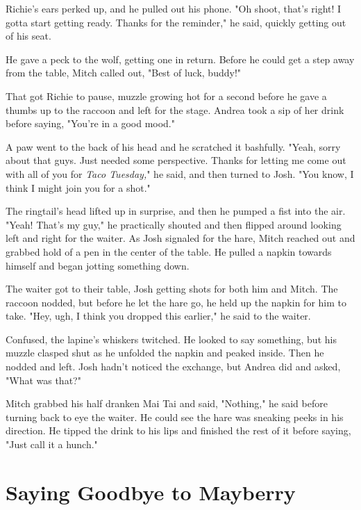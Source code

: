 Richie's ears perked up, and he pulled out his phone. "Oh shoot, that's right! I gotta start getting ready. Thanks for the reminder," he said, quickly getting out of his seat.

He gave a peck to the wolf, getting one in return. Before he could get a step away from the table, Mitch called out, "Best of luck, buddy!"

That got Richie to pause, muzzle growing hot for a second before he gave a thumbs up to the raccoon and left for the stage. Andrea took a sip of her drink before saying, "You're in a good mood."

A paw went to the back of his head and he scratched it bashfully. "Yeah, sorry about that guys. Just needed some perspective. Thanks for letting me come out with all of you for \emph{Taco Tuesday,}" he said, and then turned to Josh. "You know, I think I might join you for a shot."

The ringtail's head lifted up in surprise, and then he pumped a fist into the air. "Yeah! That's my guy," he practically shouted and then flipped around looking left and right for the waiter. As Josh signaled for the hare, Mitch reached out and grabbed hold of a pen in the center of the table. He pulled a napkin towards himself and began jotting something down.

The waiter got to their table, Josh getting shots for both him and Mitch. The raccoon nodded, but before he let the hare go, he held up the napkin for him to take. "Hey, ugh, I think you dropped this earlier," he said to the waiter.

Confused, the lapine's whiskers twitched. He looked to say something, but his muzzle clasped shut as he unfolded the napkin and peaked inside. Then he nodded and left. Josh hadn't noticed the exchange, but Andrea did and asked, "What was that?"

Mitch grabbed his half dranken Mai Tai and said, "Nothing," he said before turning back to eye the waiter. He could see the hare was sneaking peeks in his direction. He tipped the drink to his lips and finished the rest of it before saying, "Just call it a hunch."

\cleartoverso


\chapter*{Saying Goodbye to Mayberry}

